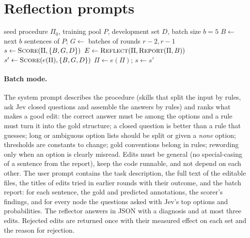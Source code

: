 \section{Reflection prompts}
\label{app:prompts}
\begin{algorithm}[h]
\small
\caption{Measured reflection in small batches.}
\label{alg:reflect}
\begin{algorithmic}[1]
\Require seed procedure $\Pi_0$, training pool $P$, development set $D$, batch size $b{=}5$
  \State $B \gets$ next $b$ sentences of $P$; $G \gets$ batches of rounds $r{-}2, r{-}1$
  \State $s \gets \textsc{Score}(\Pi, \{B, G, D\})$
  \State $E \gets \textsc{Reflect}(\Pi, \textsc{Report}(\Pi, B))$ 
    \State $s' \gets \textsc{Score}(e(\Pi), \{B, G, D\})$
      \State $\Pi \gets e(\Pi)$; $s \gets s'$
    \EndIf
  \EndFor
\EndFor
\end{algorithmic}
\end{algorithm}

\paragraph{Batch mode.} The system prompt describes the procedure (skills that split the input by rules, ask Jev closed questions and assemble the answers by rules) and ranks what makes a good edit: the correct answer must be among the options and a rule must turn it into the gold structure; a closed question is better than a rule that guesses; long or ambiguous option lists should be split or given a \emph{none} option; thresholds are constants to change; gold conventions belong in rules; rewording only when an option is clearly misread. Edits must be general (no special-casing of a sentence from the report), keep the code runnable, and not depend on each other. The user prompt contains the task description, the full text of the editable files, the titles of edits tried in earlier rounds with their outcome, and the batch report: for each sentence, the gold and predicted annotations, the scorer's findings, and for every node the questions asked with Jev's top options and probabilities. The reflector answers in JSON with a diagnosis and at most three edits. Rejected edits are returned once with their measured effect on each set and the reason for rejection.

